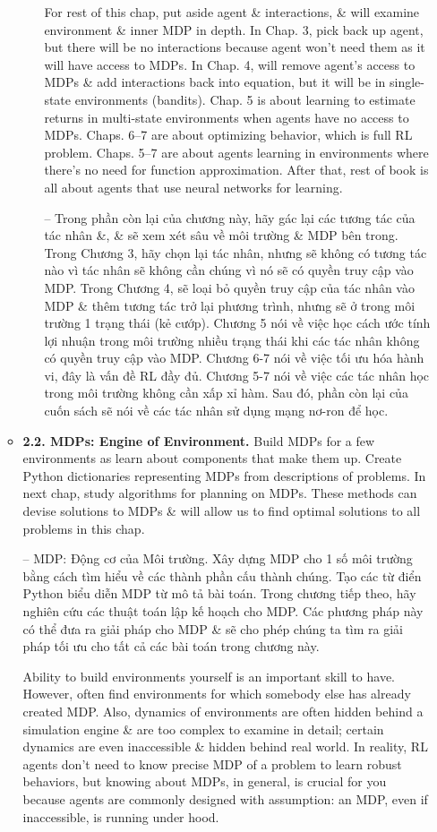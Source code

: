 \documentclass{article}
\begin{document}
\begin{itemize}
\begin{itemize}
\begin{itemize}
            For rest of this chap, put aside agent \& interactions, \& will examine environment \& inner MDP in depth. In Chap. 3, pick back up agent, but there will be no interactions because agent won't need them as it will have access to MDPs. In Chap. 4, will remove agent's access to MDPs \& add interactions back into equation, but it will be in single-state environments (bandits). Chap. 5 is about learning to estimate returns in multi-state environments when agents have no access to MDPs. Chaps. 6--7 are about optimizing behavior, which is full RL problem. Chaps. 5--7 are about agents learning in environments where there's no need for function approximation. After that, rest of book is all about agents that use neural networks for learning.

            -- Trong phần còn lại của chương này, hãy gác lại các tương tác của tác nhân \&, \& sẽ xem xét sâu về môi trường \& MDP bên trong. Trong Chương 3, hãy chọn lại tác nhân, nhưng sẽ không có tương tác nào vì tác nhân sẽ không cần chúng vì nó sẽ có quyền truy cập vào MDP. Trong Chương 4, sẽ loại bỏ quyền truy cập của tác nhân vào MDP \& thêm tương tác trở lại phương trình, nhưng sẽ ở trong môi trường 1 trạng thái (kẻ cướp). Chương 5 nói về việc học cách ước tính lợi nhuận trong môi trường nhiều trạng thái khi các tác nhân không có quyền truy cập vào MDP. Chương 6-7 nói về việc tối ưu hóa hành vi, đây là vấn đề RL đầy đủ. Chương 5-7 nói về việc các tác nhân học trong môi trường không cần xấp xỉ hàm. Sau đó, phần còn lại của cuốn sách sẽ nói về các tác nhân sử dụng mạng nơ-ron để học.
        \end{itemize}
        \item {\bf2.2. MDPs: Engine of Environment.} Build MDPs for a few environments as learn about components that make them up. Create Python dictionaries representing MDPs from descriptions of problems. In next chap, study algorithms for planning on MDPs. These methods can devise solutions to MDPs \& will allow us to find optimal solutions to all problems in this chap.

        -- {\sf MDP: Động cơ của Môi trường.} Xây dựng MDP cho 1 số môi trường bằng cách tìm hiểu về các thành phần cấu thành chúng. Tạo các từ điển Python biểu diễn MDP từ mô tả bài toán. Trong chương tiếp theo, hãy nghiên cứu các thuật toán lập kế hoạch cho MDP. Các phương pháp này có thể đưa ra giải pháp cho MDP \& sẽ cho phép chúng ta tìm ra giải pháp tối ưu cho tất cả các bài toán trong chương này.

        Ability to build environments yourself is an important skill to have. However, often find environments for which somebody else has already created MDP. Also, dynamics of environments are often hidden behind a simulation engine \& are too complex to examine in detail; certain dynamics are even inaccessible \& hidden behind real world. In reality, RL agents don't need to know precise MDP of a problem to learn robust behaviors, but knowing about MDPs, in general, is crucial for you because agents are commonly designed with assumption: an MDP, even if inaccessible, is running under hood.


\end{itemize}
\end{itemize}
\end{document}

